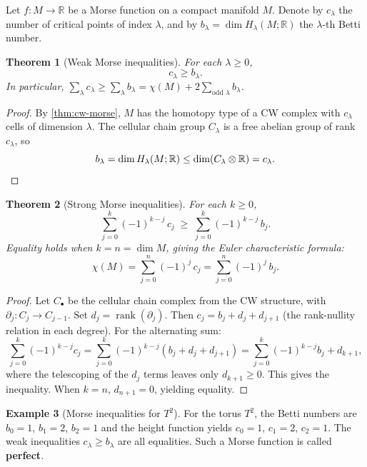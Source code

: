 \documentclass[12pt,a4paper,openany]{book}
\newtheorem{theorem}{Theorem}[section]
\theoremstyle{definition}
\newtheorem{example}[theorem]{Example}
\theoremstyle{remark}
\newcommand{\R}{\mathbb{R}}
\begin{document}
Let $f\colon M \to \R$ be a Morse function on a compact manifold $M$.
Denote by $c_\lambda$ the number of critical points of index $\lambda$,
and by $b_\lambda = \dim H_\lambda(M;\R)$ the $\lambda$-th Betti number.

\begin{theorem}[Weak Morse inequalities]\label{thm:weak-morse}
For each $\lambda \ge 0$,
\[
  c_\lambda \ge b_\lambda.
\]
In particular, $\sum_\lambda c_\lambda \ge \sum_\lambda b_\lambda = \chi(M) + 2\sum_{\text{odd } \lambda} b_\lambda$.
\end{theorem}

\begin{proof}
By \autoref{thm:cw-morse}, $M$ has the homotopy type of a CW complex
with $c_\lambda$ cells of dimension $\lambda$. The cellular chain group
$C_\lambda$ is a free abelian group of rank $c_\lambda$, so
\[
  b_\lambda = \dim H_\lambda(M;\R)
  \le \dim(C_\lambda \otimes \R) = c_\lambda. \qedhere
\]
\end{proof}

\begin{theorem}[Strong Morse inequalities]\label{thm:strong-morse}
For each $k \ge 0$,
\[
  \sum_{j=0}^{k} (-1)^{k-j}\, c_j \;\ge\; \sum_{j=0}^{k} (-1)^{k-j}\, b_j.
\]
Equality holds when $k = n = \dim M$, giving the Euler characteristic formula:
\[
  \chi(M) = \sum_{j=0}^{n} (-1)^j\, c_j = \sum_{j=0}^{n} (-1)^j\, b_j.
\]
\end{theorem}

\begin{proof}
Let $C_\bullet$ be the cellular chain complex from the CW structure,
with $\partial_j\colon C_j \to C_{j-1}$. Set $d_j = \operatorname{rank}(\partial_j)$.
Then $c_j = b_j + d_j + d_{j+1}$ (the rank-nullity relation in each degree).
For the alternating sum:
\[
  \sum_{j=0}^{k}(-1)^{k-j} c_j
  = \sum_{j=0}^{k}(-1)^{k-j}(b_j+d_j+d_{j+1})
  = \sum_{j=0}^{k}(-1)^{k-j}b_j + d_{k+1},
\]
where the telescoping of the $d_j$ terms leaves only $d_{k+1} \ge 0$.
This gives the inequality. When $k = n$, $d_{n+1} = 0$, yielding equality.
\end{proof}

\begin{example}[Morse inequalities for $T^2$]\label{ex:morse-ineq-torus}
For the torus $T^2$, the Betti numbers are $b_0=1$, $b_1=2$, $b_2=1$
and the height function yields $c_0=1$, $c_1=2$, $c_2=1$.
The weak inequalities $c_\lambda \ge b_\lambda$ are all equalities.
Such a Morse function is called \textbf{perfect}.
\end{example}
\end{document}

